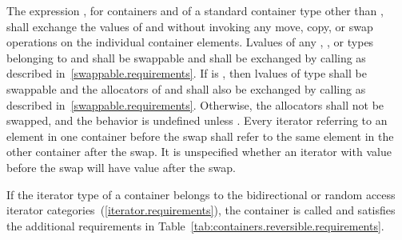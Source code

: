 \pnum
The expression , for containers  and  of a standard
container type other than , shall exchange the values of  and
 without invoking any move, copy, or swap operations on the individual
container elements.
Lvalues of any , , or  types
belonging to  and  shall be swappable
and shall be exchanged by calling 
as described in~\ref{swappable.requirements}. If
 is
, then
lvalues of type  shall be swappable and
the allocators of  and  shall also be exchanged
by calling  as described in~\ref{swappable.requirements}.
Otherwise, the allocators shall not be swapped, and the behavior is
undefined unless . Every iterator
referring to an element in one container before the swap shall refer to the same
element in the other container after the swap. It is unspecified whether an iterator
with value  before the swap will have value  after the
swap.

\pnum
If the iterator type of a container belongs to the bidirectional or
random access iterator categories~(\ref{iterator.requirements}),
the container is called
and satisfies the additional requirements
in Table~\ref{tab:containers.reversible.requirements}.

